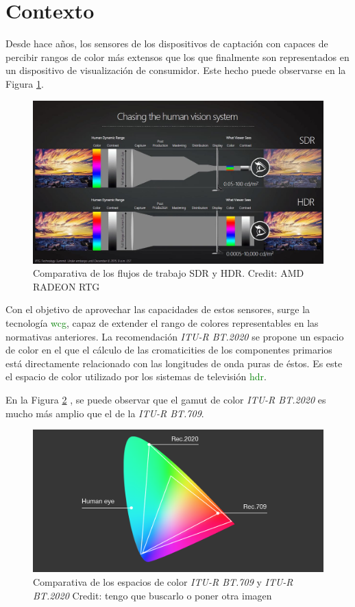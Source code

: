 \documentclass[a4paper, 12pt]{report}
\begin{document}
\section{Contexto}
\label{sec:seccion}
Desde hace años, los sensores de los dispositivos de captación con capaces de percibir rangos de color más  extensos que los que finalmente son representados en un dispositivo de visualización de consumidor. Este hecho puede observarse en la Figura \ref{fig:sdr_vs_hdr}.
\begin{figure}[H]
    \centering
    \includegraphics[width=14cm, keepaspectratio]{img/1_Introduccion/1_1_Contexto/1_hdr_sdr_range.jpg}
    \caption{Comparativa de los flujos de trabajo SDR y HDR. Credit: AMD RADEON RTG}
    \label{fig:sdr_vs_hdr}
\end{figure}
Con el objetivo de aprovechar las capacidades de estos sensores, surge la tecnología \textcolor{green}{wcg}, capaz de extender el rango de colores representables en las normativas anteriores.
La recomendación \textit{ITU-R BT.2020} se propone un espacio de color en el que  el cálculo de las cromaticities de los componentes primarios está directamente relacionado con las longitudes de onda puras de éstos. Es este el espacio de color utilizado por los sistemas de televisión \textcolor{green}{hdr}.

En la Figura \ref{fig:709_vs_2020} , se puede observar que el gamut de color \textit{ITU-R BT.2020} es mucho más amplio que el de la \textit{ITU-R BT.709}.

\begin{figure}[H]
    \centering
    \includegraphics[width=12cm, keepaspectratio]{img/1_Introduccion/1_1_Contexto/2_709_vs_2020.png}
    \caption{Comparativa de los espacios de color \textit{ITU-R BT.709} y \textit{ITU-R BT.2020} Credit: tengo que buscarlo o poner otra imagen}
    \label{fig:709_vs_2020}
\end{figure}
\end{document}
